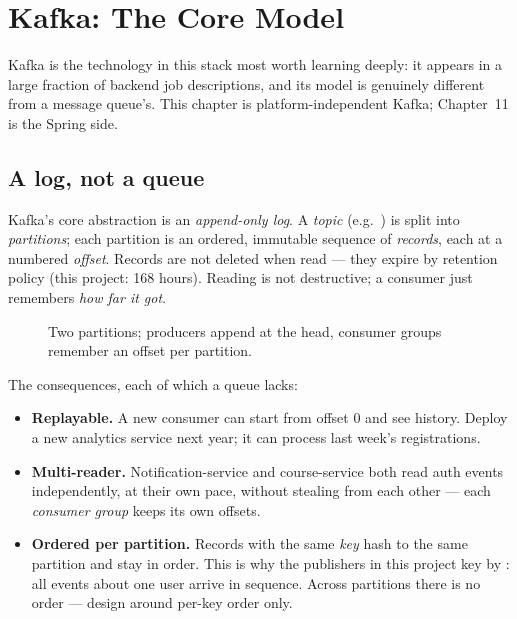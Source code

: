 \chapter{Kafka: The Core Model}
\label{ch:kafkacore}

Kafka is the technology in this stack most worth learning deeply: it
appears in a large fraction of backend job descriptions, and its model is
genuinely different from a message queue's. This chapter is
platform-independent Kafka; Chapter~11 is the Spring side.

\section{A log, not a queue}

Kafka's core abstraction is an \emph{append-only log}. A \emph{topic}
(e.g.\ ) is split into \emph{partitions}; each
partition is an ordered, immutable sequence of \emph{records}, each at a
numbered \emph{offset}. Records are not deleted when read --- they expire
by retention policy (this project: 168 hours). Reading is not
destructive; a consumer just remembers \emph{how far it got}.

\begin{figure}[h]
\centering
{}
\caption{Two partitions; producers append at the head, consumer groups
remember an offset per partition.}
\end{figure}

The consequences, each of which a queue lacks:

\begin{itemize}
  \item \textbf{Replayable.} A new consumer can start from offset 0 and
  see history. Deploy a new analytics service next year; it can process
  last week's registrations.
  \item \textbf{Multi-reader.} Notification-service and course-service
  both read auth events independently, at their own pace, without
  stealing from each other --- each \emph{consumer group} keeps its own
  offsets.
  \item \textbf{Ordered per partition.} Records with the same \emph{key}
  hash to the same partition and stay in order. This is why the
  publishers in this project key by : all events about one
  user arrive in sequence. Across partitions there is no order --- design
  around per-key order only.
\end{itemize}

